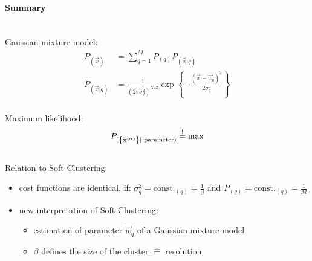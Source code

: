 \paragraph{Summary}\mbox{}\\
Gaussian mixture model:
\vspace{-0.3cm}
\begin{align*}
P_{(\vec{x})} &= \sum_{q=1}^{M} P_{(q)} P_{(\vec{x} | q)} \\
P_{(\vec{x} | q)} &= \frac{1}{\left( 2\pi \sigma_q^2 \right)^{N/2}} \exp \left\{ - \frac{\left( \vec{x} - \vec{w}_q \right)^2}{2 \sigma_q^2} \right\}
\end{align*}\\
\vspace{0.1cm}
Maximum likelihood:
\vspace{-0.1cm}
\begin{equation*}
P_{(\left\{ \underline{\mathbf{x}}^{(\alpha)} \right\} | \text{ parameter})} \stackrel{\mathrm{!}}{=} \max
\end{equation*}\\
\vspace{0.3cm}
Relation to Soft-Clustering:
\vspace{0.1cm}
\begin{itemize}
	\item cost functions are identical, if: $\sigma_q^2 = \text{const.}_{(q)} = \frac{1}{\beta}$ and $P_{(q)} = \text{const.}_{(q)} = \frac{1}{M}$
	\vspace{-0.3cm}
	\item new interpretation of Soft-Clustering:
		\begin{itemize}
			\item estimation of parameter $\vec{w}_q$ of a Gaussian mixture model
			\vspace{0.1cm}
			\item $\beta$ defines the size of the cluster $\widehat{=}$ resolution
		\end{itemize}
\end{itemize}


